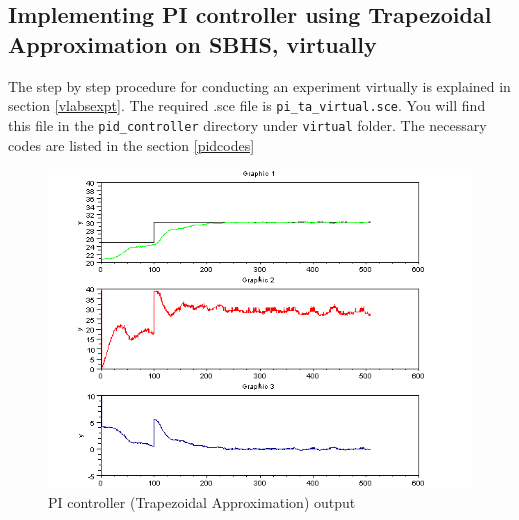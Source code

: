 \subsection{Implementing PI controller using Trapezoidal Approximation on SBHS, virtually}
The step by step procedure for conducting an experiment virtually is explained in section \ref{vlabsexpt}. The required .sce file is {\tt pi\_ta\_virtual.sce}.  You will find this file in the {\tt pid\_controller} directory under {\tt virtual} folder.  The necessary codes are listed in the section \ref{pidcodes}

\begin{figure}
\centering
\includegraphics[width=0.6\linewidth]{pid_manual/pi_ta}
\caption{PI controller (Trapezoidal Approximation) output}
\label{pi_ta}
\end{figure}
 
